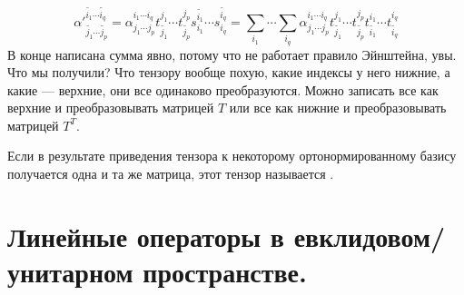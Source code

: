 \documentclass{article}
\DeclareMathOperator{\operIm}{Im}
\let\Im\operIm
\begin{document}
\begin{itemize}
\begin{Comment}
            $$
            {\alpha'}^{\widetilde{i_1}\cdots\widetilde{i_q}}_{\widetilde{j_1}\cdots\widetilde{j_p}}=\alpha^{i_1\cdots i_q}_{j_1\cdots j_p}t^{j_1}_{\widetilde{j_1}}\cdots t^{j_p}_{\widetilde{j_p}}s_{i_1}^{\widetilde{i_1}}\cdots s_{i_q}^{\widetilde{i_q}}=
            \sum\limits_{i_1}\cdots\sum\limits_{i_q}\alpha^{i_1\cdots i_q}_{j_1\cdots j_p}t^{j_1}_{\widetilde{j_1}}\cdots t^{j_p}_{\widetilde{j_p}}t^{i_1}_{\widetilde{i_1}}\cdots t^{i_q}_{\widetilde{i_q}}
            $$
            В конце написана сумма явно, потому что не работает правило Эйнштейна, увы.\\
            Что мы получили? Что тензору вообще похую, какие индексы у него нижние, а какие --- верхние, они все одинаково преобразуются. Можно записать все как верхние и преобразовывать матрицей $T$ или все как нижние и преобразовывать матрицей $T^T$.
        \end{Comment}
        \dfn Если в результате приведения тензора к некоторому ортонормированному базису получается одна и та же матрица, этот тензор называется .
    \end{itemize}
\undef{\Im}
\let\Im\operIm
    \section{Линейные операторы в евклидовом/унитарном пространстве.}
\end{document}
